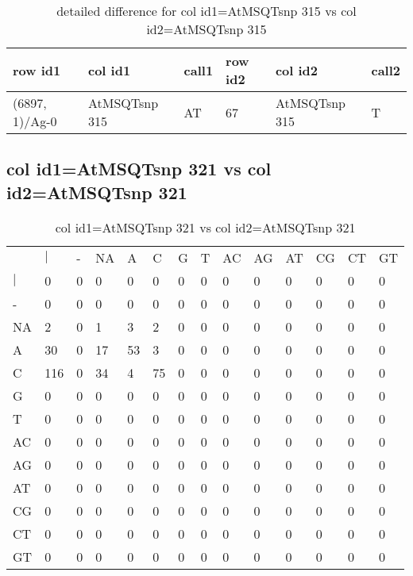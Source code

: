 \begin{center}
\begin{longtable}{|l|l|l|l|l|l|}
\caption{detailed difference for col id1=AtMSQTsnp 315 vs col id2=AtMSQTsnp 315} \label{table_dm849}\\
\hline
row id1&col id1&call1&row id2&col id2&call2\\
\hline
(6897, 1)/Ag-0&AtMSQTsnp 315&AT&67&AtMSQTsnp 315&T\\
\hline
\end{longtable}
\end{center}

\subsection{col id1=AtMSQTsnp 321 vs col id2=AtMSQTsnp 321}
\begin{center}
\begin{longtable}{|l|l|l|l|l|l|l|l|l|l|l|l|l|l|}
\caption{col id1=AtMSQTsnp 321 vs col id2=AtMSQTsnp 321} \label{table_dm850}\\
\hline
\\
\hline
&$|$&-&NA&A&C&G&T&AC&AG&AT&CG&CT&GT\\
$|$&0&0&0&0&0&0&0&0&0&0&0&0&0\\
-&0&0&0&0&0&0&0&0&0&0&0&0&0\\
NA&2&0&1&3&2&0&0&0&0&0&0&0&0\\
A&30&0&17&53&3&0&0&0&0&0&0&0&0\\
C&116&0&34&4&75&0&0&0&0&0&0&0&0\\
G&0&0&0&0&0&0&0&0&0&0&0&0&0\\
T&0&0&0&0&0&0&0&0&0&0&0&0&0\\
AC&0&0&0&0&0&0&0&0&0&0&0&0&0\\
AG&0&0&0&0&0&0&0&0&0&0&0&0&0\\
AT&0&0&0&0&0&0&0&0&0&0&0&0&0\\
CG&0&0&0&0&0&0&0&0&0&0&0&0&0\\
CT&0&0&0&0&0&0&0&0&0&0&0&0&0\\
GT&0&0&0&0&0&0&0&0&0&0&0&0&0\\
\hline
\end{longtable}
\end{center}

